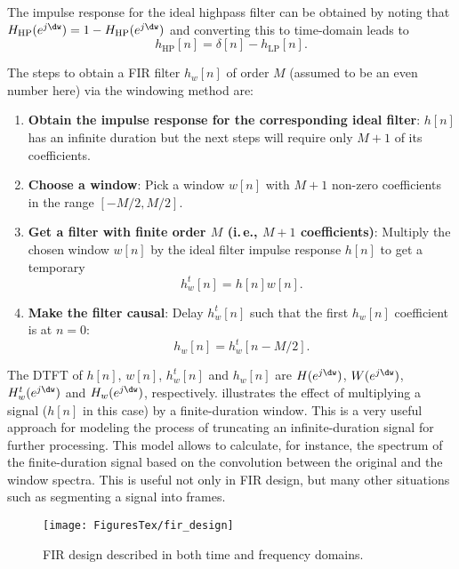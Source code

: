The impulse response for the ideal highpass filter can be obtained by
noting that $H_{\textrm{HP}}(e^{j \dw}) = 1 - H_{\textrm{HP}}(e^{j \dw})$ and converting this
to time-domain leads to 
\begin{equation}
h_{\textrm{HP}}[n] = \delta[n] - h_{\textrm{LP}}[n].
\label{eq:idealHigpass}
\end{equation}

The steps to obtain a FIR filter $h_w[n]$ of order $M$ (assumed to be an even number here) via the windowing method are:
\begin{enumerate}
	\item \textbf{Obtain the impulse response for the corresponding ideal filter}: $h[n]$ has an infinite
	duration but the next  steps will require only $M+1$ of its coefficients.
	\item \textbf{Choose a window}: Pick a window $w[n]$ with $M+1$ non-zero coefficients in the range $[-M/2, M/2]$.	
	\item \textbf{Get a filter with finite order $M$ (i.\,e., $M+1$ coefficients)}: Multiply the chosen window $w[n]$ by the ideal filter impulse response $h[n]$ to get a temporary
	\begin{equation}
	h^t_w[n] = h[n] w[n].
	\end{equation}	
	\item \textbf{Make the filter causal}: Delay $h^t_w[n]$ such that the first $h_w[n]$ coefficient is at $n=0$:
	\begin{equation}
	h_w[n] = h^t_w[n - M/2].
	\end{equation}
\end{enumerate}

The DTFT of $h[n]$, $w[n]$, $h^t_w[n]$ and $h_w[n]$ are $H(e^{j\dw})$, $W(e^{j\dw})$, $H^t_w(e^{j\dw})$ and $H_w(e^{j\dw})$, respectively.  illustrates the effect of multiplying a signal
($h[n]$ in this case) by a finite-duration window. This is a very useful approach for modeling
the process of truncating an infinite-duration signal for further processing. This model
allows to calculate, for instance, the spectrum of the finite-duration signal based on
the convolution between the original and the window spectra. This is useful not only
in FIR design, but many other situations such as segmenting a signal into frames.

\begin{figure}
\centering
\texttt{[image: FiguresTex/fir\_design]}
\caption{FIR design described in both time and frequency domains.\label{fig:fir_design}}
\end{figure}

